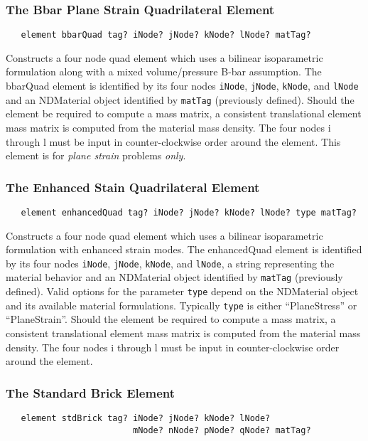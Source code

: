 \documentclass[12pt]{article}
\begin{document}
\subsubsection{The Bbar Plane Strain Quadrilateral Element}
{\sf\small
\begin{verbatim}
   element bbarQuad tag? iNode? jNode? kNode? lNode? matTag? 
\end{verbatim}
}

\noindent Constructs a four node quad
element which uses a bilinear isoparametric formulation along with
a mixed volume/pressure B-bar assumption.
The bbarQuad element is identified by its four nodes
{\tt iNode}, {\tt jNode}, {\tt kNode}, and {\tt lNode}
and an NDMaterial object identified by {\tt matTag} (previously
defined). 
Should the element be required to compute a mass matrix, a consistent 
translational element mass matrix is computed from the material
mass density.
The four nodes i through l must be input in
counter-clockwise order around the element.
This element is for {\em plane strain} problems {\em only}.


\subsubsection{The Enhanced Stain Quadrilateral Element}
{\sf\small
\begin{verbatim}
   element enhancedQuad tag? iNode? jNode? kNode? lNode? type matTag? 
\end{verbatim}
}

\noindent Constructs a four node quad element which uses a bilinear
isoparametric formulation with enhanced strain modes.
The enhancedQuad element is identified by its four nodes
{\tt iNode}, {\tt jNode}, {\tt kNode}, and {\tt lNode}, 
a string representing the material behavior
and an NDMaterial object identified by {\tt matTag} (previously
defined). 
Valid options for the parameter {\tt type} depend on the
NDMaterial object and its available material formulations.
Typically {\tt type} is either ``PlaneStress'' or ``PlaneStrain''.
Should the element be required to compute a mass matrix, a consistent 
translational element mass matrix is computed from the material
mass density. The four nodes i through l must be input in
counter-clockwise order around the element.


\subsubsection{The Standard Brick Element}
{\sf\small
\begin{verbatim}
   element stdBrick tag? iNode? jNode? kNode? lNode? 
                         mNode? nNode? pNode? qNode? matTag?
\end{verbatim}
}
\end{document}
